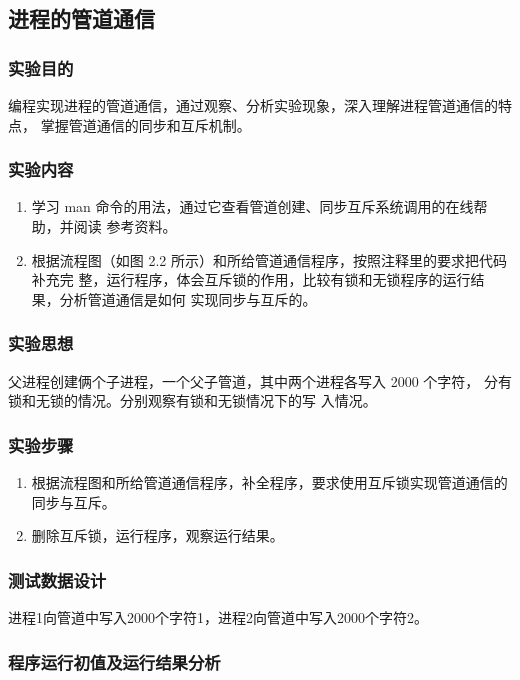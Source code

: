 \documentclass{article}
\begin{document}
    \subsection{进程的管道通信}
    \subsubsection{实验目的}
    编程实现进程的管道通信，通过观察、分析实验现象，深入理解进程管道通信的特点，
掌握管道通信的同步和互斥机制。
    \subsubsection{实验内容}

    \begin{enumerate}
        \item 学习 man 命令的用法，通过它查看管道创建、同步互斥系统调用的在线帮助，并阅读
        参考资料。
        \item 根据流程图（如图 2.2 所示）和所给管道通信程序，按照注释里的要求把代码补充完
        整，运行程序，体会互斥锁的作用，比较有锁和无锁程序的运行结果，分析管道通信是如何
        实现同步与互斥的。
    \end{enumerate}

    \subsubsection{实验思想}
    父进程创建俩个子进程，一个父子管道，其中两个进程各写入 2000 个字符， 分有锁和无锁的情况。分别观察有锁和无锁情况下的写
    入情况。
    \subsubsection{实验步骤}
    
    \begin{enumerate}
        \item 根据流程图和所给管道通信程序，补全程序，要求使用互斥锁实现管道通信的同步与互斥。
        \item 删除互斥锁，运行程序，观察运行结果。
    \end{enumerate}


    \subsubsection{测试数据设计}
    进程1向管道中写入2000个字符1，进程2向管道中写入2000个字符2。
    \subsubsection{程序运行初值及运行结果分析}
\end{document}
